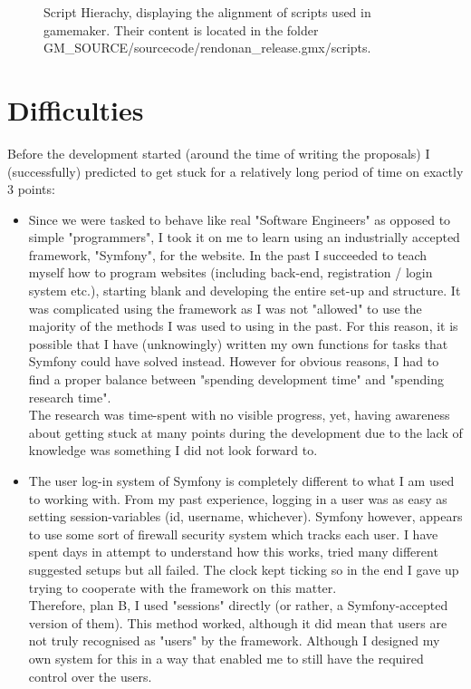\documentclass[12pt]{report}
\begin{document}
\begin{figure}[h]
\caption{Script Hierachy, displaying the alignment of scripts used in gamemaker. Their content is located in the folder GM\_SOURCE/sourcecode/rendonan\_release.gmx/scripts.}
\end{figure}
\vspace{2em}
\section*{Difficulties}
Before the development started (around the time of writing the proposals) I (successfully) predicted to get stuck for a relatively long period of time on exactly 3 points:
\begin{itemize}
\item Since we were tasked to behave like real "Software Engineers" as opposed to simple "programmers", I took it on me to learn using an industrially accepted framework, "Symfony", for the website. In the past I succeeded to teach myself how to program websites (including back-end, registration / login system etc.), starting blank and developing the entire set-up and structure. It was complicated using the framework as I was not "allowed" to use the majority of the methods I was used to using in the past. For this reason, it is possible that I have (unknowingly) written my own functions for tasks that Symfony could have solved instead. However for obvious reasons, I had to find a proper balance between "spending development time" and "spending research time".\\
The research was time-spent with no visible progress, yet, having awareness about getting stuck at many points during the development due to the lack of knowledge was something I did not look forward to.

\item The user log-in system of Symfony is completely different to what I am used to working with. From my past experience, logging in a user was as easy as setting session-variables (id, username, whichever). Symfony however, appears to use some sort of firewall security system which tracks each user. I have spent days in attempt to understand how this works, tried many different suggested setups but all failed. The clock kept ticking so in the end I gave up trying to cooperate with the framework on this matter.\\
Therefore, plan B, I used "sessions" directly (or rather, a Symfony-accepted version of them). This method worked, although it did mean that users are not truly recognised as "users" by the framework. Although I designed my own system for this in a way that enabled me to still have the required control over the users.


\end{itemize}
\end{document}
